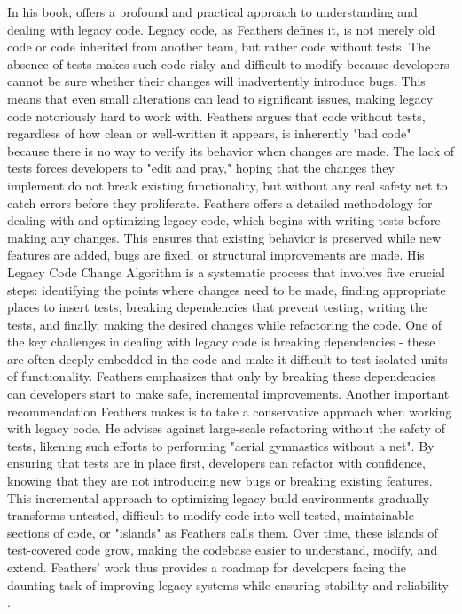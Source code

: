 In his book, \citet{feathersWorkingEffectivelyLegacy2004} offers a profound and practical approach to understanding and dealing with legacy code.
Legacy code, as Feathers defines it, is not merely old code or code inherited from another team, but rather code without tests.
The absence of tests makes such code risky and difficult to modify because developers cannot be sure whether their changes will inadvertently introduce bugs.
This means that even small alterations can lead to significant issues, making legacy code notoriously hard to work with.
Feathers argues that code without tests, regardless of how clean or well-written it appears, is inherently "bad code" because there is no way to verify its behavior when changes are made.
The lack of tests forces developers to "edit and pray," hoping that the changes they implement do not break existing functionality, but without any real safety net to catch errors before they proliferate.
Feathers offers a detailed methodology for dealing with and optimizing legacy code, which begins with writing tests before making any changes.
This ensures that existing behavior is preserved while new features are added, bugs are fixed, or structural improvements are made.
His Legacy Code Change Algorithm is a systematic process that involves five crucial steps: identifying the points where changes need to be made, finding appropriate places to insert tests, breaking dependencies that prevent testing, writing the tests, and finally, making the desired changes while refactoring the code.
One of the key challenges in dealing with legacy code is breaking dependencies - these are often deeply embedded in the code and make it difficult to test isolated units of functionality.
Feathers emphasizes that only by breaking these dependencies can developers start to make safe, incremental improvements.
Another important recommendation Feathers makes is to take a conservative approach when working with legacy code.
He advises against large-scale refactoring without the safety of tests, likening such efforts to performing "aerial gymnastics without a net".
By ensuring that tests are in place first, developers can refactor with confidence, knowing that they are not introducing new bugs or breaking existing features.
This incremental approach to optimizing legacy build environments gradually transforms untested, difficult-to-modify code into well-tested, maintainable sections of code, or "islands" as Feathers calls them.
Over time, these islands of test-covered code grow, making the codebase easier to understand, modify, and extend.
Feathers' work thus provides a roadmap for developers facing the daunting task of improving legacy systems while ensuring stability and reliability \citep{feathersWorkingEffectivelyLegacy2004}.

